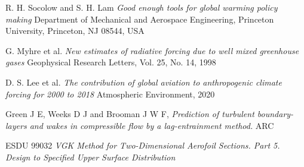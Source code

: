 \documentclass{article}
\begin{document}
\begin{thebibliography}{9}


    R. H. Socolow and S. H. Lam
    \emph{Good enough tools for global warming policy making}
    Department of Mechanical and Aerospace Engineering, Princeton University,
    Princeton, NJ 08544, USA

    G. Myhre et al.
    \emph{New estimates of radiative forcing due to well mixed greenhouse gases}
    Geophysical Research Letters, Vol. 25, No. 14, 1998

    D. S. Lee et al.
    \emph{The contribution of global aviation to anthropogenic climate forcing for 2000 to 2018}
    Atmospheric Environment, 2020

    Green J E, Weeks D J and Brooman J W F,
    \emph{Prediction of turbulent boundary-layers and wakes in compressible flow by a lag-entrainment method.}
    ARC

    ESDU 99032
    \emph{VGK Method for Two-Dimensional Aerofoil Sections. Part 5. Design to Specified Upper Surface Distribution}
  
\end{thebibliography}
\end{document}

